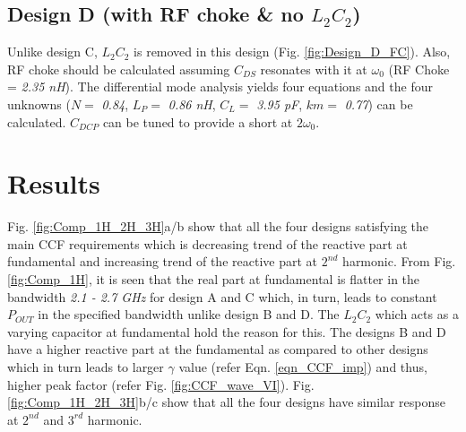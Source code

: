 \documentclass[conference]{IEEEtran}
\begin{document}
\subsection{Design D (with RF choke \& no $L_2C_2$)}
 Unlike design C, $L_2C_2$ is removed in this design (Fig. \ref{fig:Design_D_FC}). Also, RF choke should be calculated assuming $C_{DS}$ resonates with it at $\omega_0$ (RF Choke = \textit{2.35 nH}).
The differential mode analysis yields four equations and the four unknowns ($N =$ \textit{0.84}, $L_P =$ \textit{0.86 nH}, $C_L =$ \textit{3.95 pF}, $km =$ \textit{0.77}) can be calculated.
$C_{DCP}$ can be tuned to provide a short at $2\omega_0$.

\section{Results}
\label{section:Results}

Fig. \ref{fig:Comp_1H_2H_3H}a/b show that all the four designs satisfying the main CCF requirements which is decreasing trend of the reactive part at fundamental and increasing trend of the reactive part at $2^{nd}$ harmonic.
From Fig. \ref{fig:Comp_1H}, it is seen that the real part at fundamental is flatter in the bandwidth \textit{2.1 - 2.7 GHz} for design A and C which, in turn, leads to constant $P_{OUT}$ in the specified bandwidth unlike design B and D. The $L_2C_2$ which acts as a varying capacitor at fundamental hold the reason for this. The designs B and D have a higher reactive part at the fundamental as compared to other designs which in turn leads to larger $\gamma$ value (refer Eqn. \ref{eqn_CCF_imp}) and thus, higher peak factor (refer Fig. \ref{fig:CCF_wave_VI}). Fig. \ref{fig:Comp_1H_2H_3H}b/c show that all the four designs have similar response at $2^{nd}$ and $3^{rd}$ harmonic. 
\end{document}
